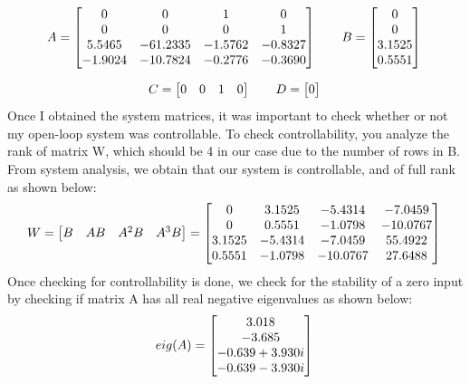 \documentclass[12pt]{article}
\begin{document}
\begin{equation*}
   A = \begin{bmatrix}
    0 & 0 & 1 & 0\\
    0 & 0 & 0 & 1\\
    5.5465 & -61.2335 & -1.5762 &   -0.8327 \\
    -1.9024 & -10.7824 &  -0.2776 &  -0.3690  \\
    \end{bmatrix} \qquad B = \begin{bmatrix}
    0\\ 0\\  3.1525\\0.5551
    \end{bmatrix}\\ 
\end{equation*}

\begin{equation*}
    C = \begin{bmatrix}
    0 & 0 & 1 & 0
    \end{bmatrix} \qquad D = \begin{bmatrix}
    0
    \end{bmatrix}\\
\end{equation*}
Once I obtained the system matrices, it was important to check whether or not my open-loop system was controllable. To check controllability, you analyze the rank of matrix W, which should be 4 in our case due to the number of rows in B. From system analysis, we obtain that our system is controllable, and of full rank as shown below:
\begin{equation*}
   W = \begin{bmatrix}
    B & AB & {A^2}B & {A^3}B
    \end{bmatrix} = \begin{bmatrix}
    0  &  3.1525 &  -5.4314  & -7.0459\\ 0  &  0.5551  & -1.0798 & -10.0767\\ 3.1525 &  -5.4314  & -7.0459 &  55.4922\\0.5551 &  -1.0798 & -10.0767 &  27.6488
    \end{bmatrix}\\
\end{equation*}
Once checking for controllability is done, we check for the stability of a zero input by checking if matrix A has all real negative eigenvalues as shown below:
\begin{equation*}
    eig(A) = \begin{bmatrix}
     3.018 \\ -3.685
 \\ -0.639+3.930i \\
 -0.639-3.930i
    \end{bmatrix}\\
\end{equation*}
\end{document}
